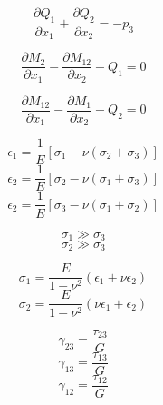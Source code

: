 		\begin{equation}\label{eq2.90}
		  \frac{\partial Q_1}{\partial x_1} + \frac{\partial Q_2}{\partial x_2} = -p_3
		\end{equation}

		\begin{equation}\label{eq2.91}
		  \frac{\partial M_2}{\partial x_1} - \frac{\partial M_{12}}{\partial x_2} - Q_1 = 0
		\end{equation}

		\begin{equation}\label{eq2.92}
		  \frac{\partial M_{12}}{\partial x_1} - \frac{\partial M_1}{\partial x_2} - Q_2 = 0
		\end{equation}

		\begin{equation}
		\epsilon_1 = \frac{1}{E}\left[ \sigma_1 - \nu \left( \sigma_2 + \sigma_3 \right) \right]
		\end{equation}
		\begin{equation}
		\epsilon_2 = \frac{1}{E}\left[ \sigma_2 - \nu \left( \sigma_1 + \sigma_3 \right) \right]
		\end{equation}
		\begin{equation}
		\epsilon_2 = \frac{1}{E}\left[ \sigma_3 - \nu \left( \sigma_1 + \sigma_2 \right) \right]
		\end{equation}

		\begin{equation}
		  \sigma_1 \gg \sigma_3
		\end{equation}
		\begin{equation}
		  \sigma_2 \gg \sigma_3
		\end{equation}

		\begin{equation}
		\sigma_1 = \frac{E}{1-\nu^2} \left( \epsilon_1 + \nu \epsilon_2 \right)
		\end{equation}
		\begin{equation}
		\sigma_2 = \frac{E}{1-\nu^2} \left( \nu \epsilon_1 + \epsilon_2 \right)
		\end{equation}

		\begin{equation}
		\gamma_{23} = \frac{\tau_{23}}{G}
		\end{equation}
		\begin{equation}
		\gamma_{13} = \frac{\tau_{13}}{G}
		\end{equation}          
		\begin{equation}
		\gamma_{12} = \frac{\tau_{12}}{G}
		\end{equation}


